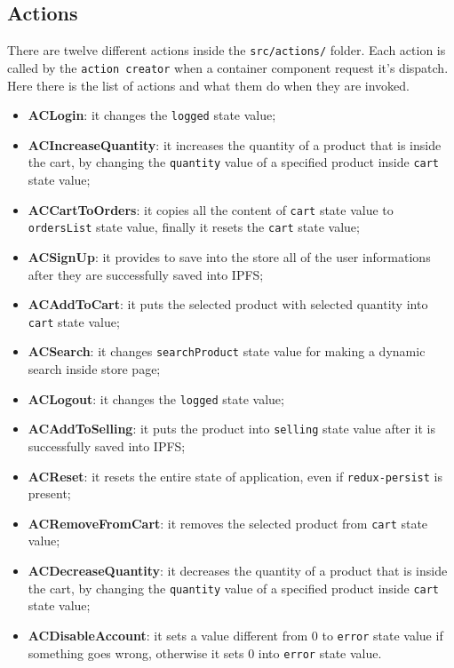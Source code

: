 \subsection{Actions}
There are twelve different actions inside the \texttt{src/actions/} folder. Each action is called by the \texttt{action creator} when a container component request it's dispatch. Here there is the list of actions and what them do when they are invoked.
\begin{itemize}
	\item \textbf{ACLogin}: it changes the \texttt{logged} state value;
	\item \textbf{ACIncreaseQuantity}: it increases the quantity of a product that is inside the cart, by changing the \texttt{quantity} value of a specified product inside \texttt{cart} state value;
	\item \textbf{ACCartToOrders}: it copies all the content of \texttt{cart} state value to \texttt{ordersList} state value, finally it resets the \texttt{cart} state value;
	\item \textbf{ACSignUp}: it provides to save into the store all of the user informations after they are successfully saved into IPFS;
	\item \textbf{ACAddToCart}: it puts the selected product with selected quantity into \texttt{cart} state value;
	\item \textbf{ACSearch}: it changes \texttt{searchProduct} state value for making a dynamic search inside store page;
	\item \textbf{ACLogout}: it changes the \texttt{logged} state value;
	\item \textbf{ACAddToSelling}: it puts the product into \texttt{selling} state value after it is successfully saved into IPFS;
	\item \textbf{ACReset}: it resets the entire state of application, even if \texttt{redux-persist} is present;
	\item \textbf{ACRemoveFromCart}: it removes the selected product from \texttt{cart} state value;
	\item \textbf{ACDecreaseQuantity}: it decreases the quantity of a product that is inside the cart, by changing the \texttt{quantity} value of a specified product inside \texttt{cart} state value;
	\item \textbf{ACDisableAccount}: it sets a value different from 0 to \texttt{error} state value if something goes wrong, otherwise it sets 0 into \texttt{error} state value.
\end{itemize}

